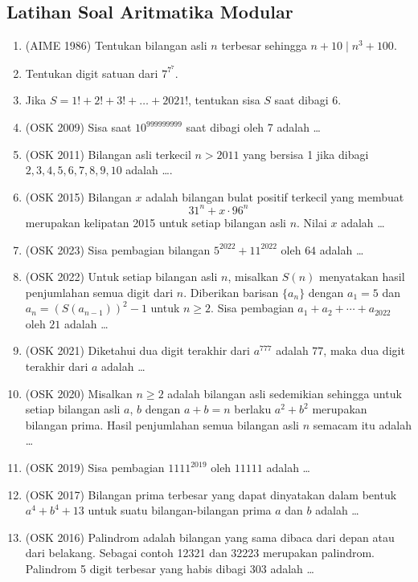 \subsection{Latihan Soal Aritmatika Modular}
\begin{enumerate}    
    \item (AIME 1986) Tentukan bilangan asli $n$ terbesar sehingga $n+10 \mid n^3+100$.
    
    \item Tentukan digit satuan dari $7^{7^7}$.
    
    \item Jika $S=1!+2!+3!+\dots+2021!$, tentukan sisa $S$ saat dibagi 6.
    
    \item (OSK 2009) Sisa saat $10^{999999999}$ saat dibagi oleh 7 adalah \dots
    
    \item (OSK 2011) Bilangan asli terkecil $n>2011$ yang bersisa 1 jika dibagi $2,3,4,5,6,7,8,9,10$ adalah \dots.

    \item (OSK 2015) Bilangan $x$ adalah bilangan bulat positif terkecil yang membuat
    \[31^n + x \cdot 96^n\]
    merupakan kelipatan 2015 untuk setiap bilangan asli $n$. Nilai $x$ adalah \ldots

    \item (OSK 2023) Sisa pembagian bilangan $5^{2022}+11^{2022}$ oleh $64$ adalah \ldots

    \item (OSK 2022) Untuk setiap bilangan asli $n$, misalkan $S(n)$ menyatakan hasil penjumlahan semua digit dari $n$. Diberikan barisan $\{a_n\}$ dengan $a_1 = 5$ dan $a_n = (S(a_{n-1}))^2 - 1$ untuk $n \geq 2$. Sisa pembagian $a_1 + a_2 + \cdots + a_{2022}$ oleh $21$ adalah \ldots
    
    \item (OSK 2021) Diketahui dua digit terakhir dari $a^{777}$ adalah $77$, maka dua digit terakhir dari $a$ adalah \ldots

    \item (OSK 2020) Misalkan $n \geq 2$ adalah bilangan asli sedemikian sehingga untuk setiap bilangan asli $a$, $b$ dengan $a + b = n$ berlaku $a^2 + b^2$ merupakan bilangan prima. Hasil penjumlahan semua bilangan asli $n$ semacam itu adalah \ldots

    \item (OSK 2019) Sisa pembagian $1111^{2019}$ oleh $11111$ adalah \ldots

    \item (OSK 2017) Bilangan prima terbesar yang dapat dinyatakan dalam bentuk $a^4+b^4+13$ untuk suatu bilangan-bilangan prima $a$ dan $b$ adalah \ldots

    \item (OSK 2016) Palindrom adalah bilangan yang sama dibaca dari depan atau dari belakang. Sebagai contoh 12321 dan 32223 merupakan palindrom. Palindrom 5 digit terbesar yang habis dibagi 303 adalah \ldots
\end{enumerate}